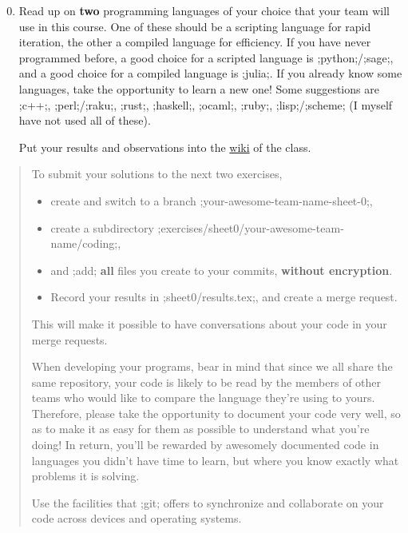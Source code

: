 \documentclass[11pt]{amsart}
\newcommand{\alert}[1]{\textbf{\color{red}#1}}
\begin{document}
\medskip
\begin{enumerate}
  \setcounter{enumi}{-1}
\item
  Read up on \alert{two} programming languages of your choice that your team will use in this course.
  One of these should be a scripting language for rapid iteration, the other a compiled language for efficiency.
  If you have never programmed before, a good choice for a scripted language is ;python;/;sage;, and a good choice for a compiled language is ;julia;.
  If you already know some languages, take the opportunity to learn a new one! Some suggestions are ;c++;, ;perl;/;raku;, ;rust;, ;haskell;, ;ocaml;, ;ruby;, ;lisp;/;scheme;
  (I myself have not used all of these).

  \medskip
  Put your results and observations into the \href{https://gitlab.mat-apl.upc.edu/julian.pfeifle/2019-dag-upc/wikis/programming-languages}{wiki} of the class.
\end{enumerate}

\vfill

\begin{quotation}\small
  To submit your solutions to the next two exercises,

  \medskip
  \begin{itemize}[$\quad\triangleright$]
  \item create and switch to a branch ;your-awesome-team-name-sheet-0;,
  \item create a subdirectory ;exercises/sheet0/your-awesome-team-name/coding;,
  \item and ;add; \alert{all} files you create to your commits, \alert{without encryption}.
  \item Record your results in ;sheet0/results.tex;, and create a merge request.
  \end{itemize}

  \medskip
  \noindent This will make it possible to have conversations about your code in your merge requests.

  \medskip
  When developing your programs, bear in mind that since we all share the same repository,
  your code is likely to be read by the members of other teams who would like to compare the language they're using to yours.
  Therefore, please take the opportunity to document your code very well, so as to make it as easy for them as possible to understand what you're doing!
  In return, you'll be rewarded by awesomely documented code in languages you didn't have time to learn, but where you know exactly what problems it is solving.

  \medskip
  Use the facilities that ;git; offers to synchronize and collaborate on your code across devices and operating systems.
\end{quotation}
\end{document}

